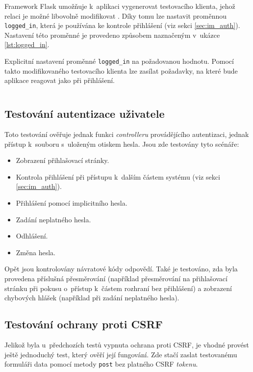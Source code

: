 Framework Flask umožňuje k~aplikaci vygenerovat testovacího klienta, jehož relaci je možné libovolně modifikovat \cite{flask_testing}. Díky tomu lze nastavit proměnnou \texttt{logged\_in}, která je používána ke kontrole přihlášení (viz sekci \ref{sec:im_auth}). Nastavení této proměnné je provedeno způsobem naznačeným v~ukázce \ref{lst:logged_in}.

\begin{listing}[htbp]
\caption{\label{lst:logged_in} Explicitní nastavení proměnné \texttt{logged\_in} na požadovanou hodnotu. Pomocí takto modifikovaného testovacího klienta lze zasílat požadavky, na které bude aplikace reagovat jako při přihlášení.}
\inputminted[bgcolor=codebg]{python}{source-samples/logged_in.py}
\end{listing}

\subsection{Testování autentizace uživatele}

Toto testování ověřuje jednak funkci \textit{controlleru} provádějícího autentizaci, jednak přístup k~souboru s~uloženým otiskem hesla. Jsou zde testovány tyto scénáře:

\begin{itemize}
    \item Zobrazení přihlašovací stránky.
    \item Kontrola přihlášení při přístupu k~dalším částem systému (viz sekci \ref{sec:im_auth}).
    \item Přihlášení pomocí implicitního hesla.
    \item Zadání neplatného hesla.
    \item Odhlášení.
    \item Změna hesla.
\end{itemize}

Opět jsou kontrolovány návratové kódy odpovědí. Také je testováno, zda byla provedena příslušná přesměrování (například přesměrování na přihlašovací stránku při pokusu o~přístup k~částem rozhraní bez přihlášení) a zobrazení chybových hlášek (například při zadání neplatného hesla).

\subsection{Testování ochrany proti CSRF}
\label{sec:te_csrf}

Jelikož byla u~předchozích testů vypnuta ochrana proti CSRF, je vhodné provést ještě jednoduchý test, který ověří její fungování. Zde stačí zaslat testovanému formuláři data pomocí metody \texttt{post} bez platného CSRF \textit{tokenu}.

